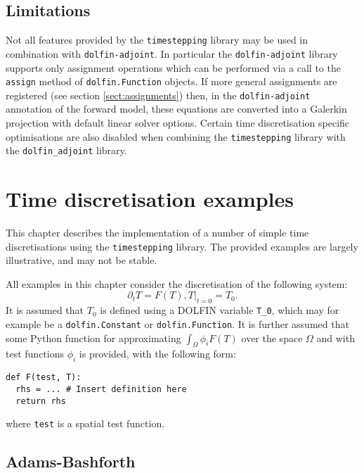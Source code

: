 \documentclass[a4paper]{book}
\begin{document}
\section{Limitations}

Not all features provided by the \verb+timestepping+ library may be used in
combination with \verb+dolfin-adjoint+. In particular the \verb+dolfin-adjoint+
library supports only assignment operations which can be performed via a call
to the \verb+assign+ method of \verb+dolfin.Function+ objects. If more general
assignments are registered (see section \ref{sect:assignments}) then, in the
\verb+dolfin-adjoint+ annotation of the forward model, these equations are
converted into a Galerkin projection with default linear solver options. Certain 
time discretisation specific optimisations are also disabled when combining the
\verb+timestepping+ library with the \verb+dolfin_adjoint+ library.

\chapter{Time discretisation examples}

This chapter describes the implementation of a number of simple time
discretisations using the \verb+timestepping+ library. The provided examples are
largely illustrative, and may not be stable.

All examples in this chapter consider
the discretisation of the following system:
\begin{subequations}
  \begin{equation}\label{eqn:t_timestep}
    \partial_t T = F(T),
  \end{equation}
  \begin{equation}\label{eqn:t_init}
    \left. T \right|_{t = 0} = T_0.
  \end{equation}
\end{subequations}
It is assumed that $T_0$ is defined using a DOLFIN variable \verb+T_0+, which
may for example be a \verb+dolfin.Constant+ or \verb+dolfin.Function+. It is
further assumed that some Python function for approximating
$\int_\Omega \phi_i F(T)$ over the space $\Omega$ and with test functions
$\phi_i$ is provided, with the following form:
\begin{lstlisting}
def F(test, T):
  rhs = ... # Insert definition here
  return rhs
\end{lstlisting}
where \verb+test+ is a spatial test function.

\section{Adams-Bashforth}
\end{document}
